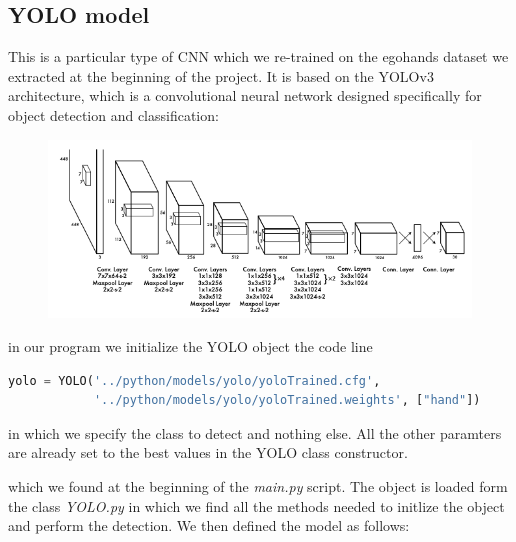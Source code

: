 \subsection{YOLO model}
This is a particular type of CNN which we re-trained on the egohands dataset we extracted at the beginning of the project. It is based on the YOLOv3 architecture, which is a convolutional neural network designed specifically
for object detection and classification:

\begin{figure}[!h]
    \centering
    \includegraphics[scale = 0.5]{images/yolo1_net.png}
\end{figure}

in our program we initialize the YOLO object the code line 

\begin{lstlisting}[language=python]
    yolo = YOLO('../python/models/yolo/yoloTrained.cfg',
            '../python/models/yolo/yoloTrained.weights', ["hand"])
\end{lstlisting}
in which we specify the class to detect and nothing else. All the other paramters are already set to the best values in the 
YOLO class constructor.

which we found at the beginning of the \textit{main.py} script. The object is loaded form the class \textit{YOLO.py}
in which we find all the methods needed to initlize the object and perform the detection. We then defined the model as follows:

